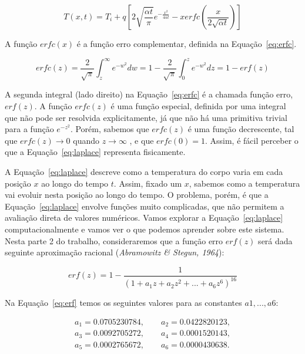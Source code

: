 \documentclass[12pt]{article}
\begin{document}
\begin{equation}
T(x, t) = T_{i} + q \left[ 2 \sqrt{\frac{\alpha t}{\pi}} e^{- \frac{x^{2}}{4\alpha t}} - xerfc \left( \frac{x}{2 \sqrt{\alpha t}} \right) \right]
\label{eq:laplace}
\end{equation}

A função $erfc(x)$ é a função erro complementar, definida na Equação~\ref{eq:erfc}.

\begin{equation}
erfc(z) = \frac{2}{\sqrt{\pi}} \int_{z}^{\infty} e^{-w^{2}} dw = 1 - \frac{2}{\sqrt{\pi}} \int_{0}^{z} e^{-w^{2}} dz = 1 - erf(z)
\label{eq:erfc}
\end{equation}

A segunda integral (lado direito) na Equação~\ref{eq:erfc} é a chamada função erro, $erf(z)$.
A função $erfc(z)$ é uma função especial, definida por uma integral que não pode ser resolvida explicitamente, já que não há uma primitiva trivial para a função $e^{-z^{2}}$. Porém, sabemos que $erfc(z)$ é uma função decrescente, tal que $erfc(z) \rightarrow 0$ quando $z \rightarrow \infty$ , e que $erfc(0) = 1$.
Assim, é fácil perceber o que a Equação~\ref{eq:laplace} representa fisicamente.

A Equação~\ref{eq:laplace} descreve como a temperatura do corpo varia em cada posição $x$ ao longo do tempo $t$. Assim, fixado um $x$, sabemos como a temperatura vai evoluir nesta posição ao longo do tempo. O problema, porém, é que a Equação~\ref{eq:laplace} envolve funções muito complicadas, que não permitem a avaliação direta de valores numéricos. Vamos explorar a Equação~\ref{eq:laplace} computacionalmente e vamos ver o que podemos aprender sobre este sistema. Nesta parte 2 do trabalho, consideraremos que a função erro $erf(z)$ será dada seguinte aproximação racional (\textit{Abramowitz \& Stegun, 1964}):

\begin{equation}
erf(z) = 1 - \frac{1}{(1 + a_{1}z + a_{2}z^{2} + ... + a_{6}z^{ 6 })^{16}}
\label{eq:erf}
\end{equation}

Na Equação~\ref{eq:erf} temos os seguintes valores para as constantes $a1, . . . , a6$:

\begin{align*}
a_{1} = 0.0705230784, \qquad a_{2} = 0.0422820123, \\
a_{3} = 0.0092705272, \qquad a_{4} = 0.0001520143, \\
a_{5} = 0.0002765672, \qquad a_{6} = 0.0000430638. \\
\end{align*}
\end{document}
